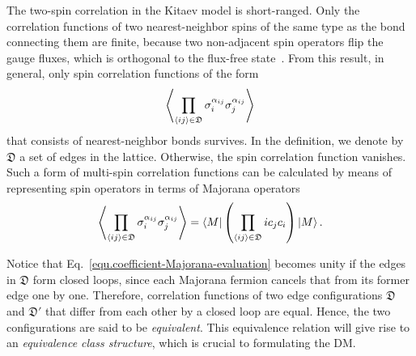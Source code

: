 The two-spin correlation in the Kitaev model is short-ranged. Only the correlation functions of two nearest-neighbor spins of the same type as the bond connecting them are finite, because two non-adjacent spin operators flip the gauge fluxes, which is orthogonal to the flux-free state~\cite{Bakaran-Mandal-Shankar_2007}. From this result, in general, only spin correlation functions of the form
\begin{equation}\label{equ.only-finite-correlation}
    \left\langle \prod_{\left\langle ij \right\rangle\in \mathfrak{D}}\sigma^{\alpha_{i j}}_{i}\sigma^{\alpha_{i j}}_{j} \right\rangle
\end{equation}
that consists of nearest-neighbor bonds survives. In the definition, we denote by $\mathfrak{D}$ a set of edges in the lattice.  Otherwise, the spin correlation function vanishes. Such a form of multi-spin correlation functions can be calculated by means of representing spin operators in terms of Majorana operators
\begin{equation}\label{equ.coefficient-Majorana-evaluation}
    \left\langle \prod_{\left\langle ij \right\rangle\in \mathfrak{D}}\sigma^{\alpha_{i j}}_{i}\sigma^{\alpha_{i j}}_{j} \right\rangle = \bra{M}\left( \prod_{\left\langle ij \right\rangle\in\mathfrak{D}}ic_jc_i \right)\ket{M}.
\end{equation} 

Notice that Eq.~\eqref{equ.coefficient-Majorana-evaluation} becomes unity if the edges in $\mathfrak{D}$ form closed loops, since each Majorana fermion cancels that from its former edge one by one. Therefore, correlation functions of two edge configurations $\mathfrak{D}$ and $\mathfrak{D}'$ that differ from each other by a closed loop are equal. Hence, the two configurations are said to be \textit{equivalent}. This equivalence relation will give rise to an \textit{equivalence class structure}, which is crucial to formulating the DM.

